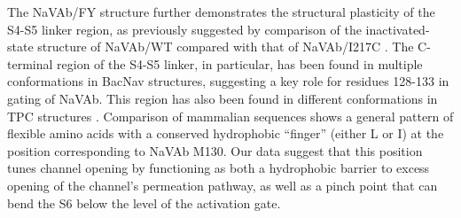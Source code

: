 \begin{refsection}
{The NaVAb/FY structure further demonstrates the structural plasticity of the S4-S5 linker region, as previously suggested by comparison of the inactivated-state structure of NaVAb/WT compared with that of NaVAb/I217C \cite{Payandeh:2013ex}. The C-terminal region of the S4-S5 linker, in particular, has been found in multiple conformations in BacNav structures, suggesting a key role for residues 128-133 in gating of NaVAb. This region has also been found in different conformations in TPC structures \cite{Guo:2016jb,Kintzer:2016eu}. Comparison of mammalian sequences shows a general pattern of flexible amino acids with a conserved hydrophobic ``finger'' (either L or I) at the position corresponding to NaVAb M130. Our data suggest that this position tunes channel opening by functioning as both a hydrophobic barrier to excess opening of the channel's permeation pathway, as well as a pinch point that can bend the S6 below the level of the activation gate.

}
\end{refsection}
